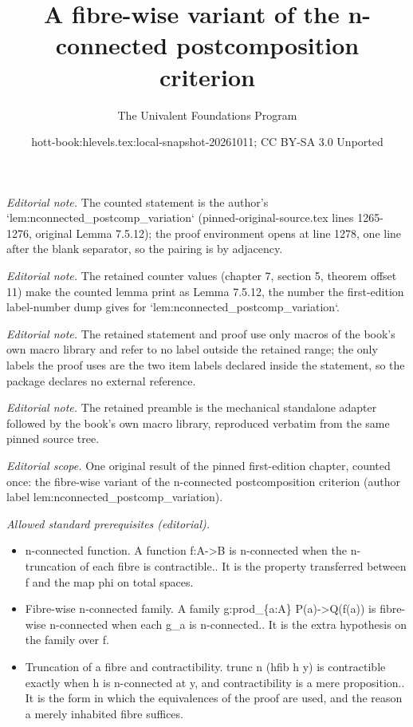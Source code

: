 \documentclass[10pt,a4paper]{article}
\title{A fibre-wise variant of the n-connected postcomposition criterion}
\author{The Univalent Foundations Program}
\date{hott-book:hlevels.tex:local-snapshot-20261011; CC BY-SA 3.0 Unported}
\newcounter{chapter}
\theoremstyle{definition}
\theoremstyle{remark}
\numberwithin{equation}{section}
\begin{document}
\maketitle
\setcounter{chapter}{7}
\setcounter{section}{5}
\setcounter{thm}{11}
\noindent\textit{Editorial note.} The counted statement is the author's `lem:nconnected\_postcomp\_variation` (pinned-original-source.tex lines 1265-1276, original Lemma 7.5.12); the proof environment opens at line 1278, one line after the blank separator, so the pairing is by adjacency.\par\medskip
\noindent\textit{Editorial note.} The retained counter values (chapter 7, section 5, theorem offset 11) make the counted lemma print as Lemma 7.5.12, the number the first-edition label-number dump gives for `lem:nconnected\_postcomp\_variation`.\par\medskip
\noindent\textit{Editorial note.} The retained statement and proof use only macros of the book's own macro library and refer to no label outside the retained range; the only labels the proof uses are the two item labels declared inside the statement, so the package declares no external reference.\par\medskip
\noindent\textit{Editorial note.} The retained preamble is the mechanical standalone adapter followed by the book's own macro library, reproduced verbatim from the same pinned source tree.\par\medskip
\noindent\textit{Editorial scope.} One original result of the pinned first-edition chapter, counted once: the fibre-wise variant of the n-connected postcomposition criterion (author label lem:nconnected\_postcomp\_variation).\par\medskip
\noindent\textit{Allowed standard prerequisites (editorial).}\begin{itemize}
\item n-connected function. A function f:A->B is n-connected when the n-truncation of each fibre is contractible.. It is the property transferred between f and the map phi on total spaces.
\item Fibre-wise n-connected family. A family g:prod\_\{a:A\} P(a)->Q(f(a)) is fibre-wise n-connected when each g\_a is n-connected.. It is the extra hypothesis on the family over f.
\item Truncation of a fibre and contractibility. trunc n (hfib h y) is contractible exactly when h is n-connected at y, and contractibility is a mere proposition.. It is the form in which the equivalences of the proof are used, and the reason a merely inhabited fibre suffices.
\end{itemize}\medskip
\end{document}
